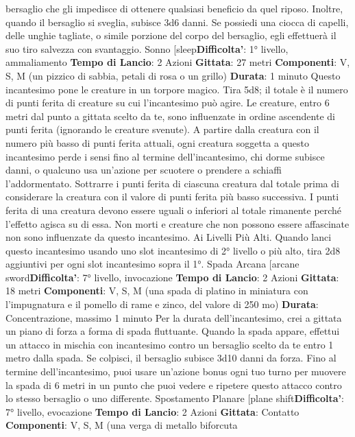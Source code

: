 \begin{multicols}{2}
bersaglio che gli impedisce di ottenere qualsiasi
beneficio da quel riposo. Inoltre, quando il bersaglio si
sveglia, subisce 3d6 danni.
Se possiedi una ciocca di capelli, delle unghie tagliate,
o simile porzione del corpo del bersaglio, egli effettuerà
il suo tiro salvezza con svantaggio.
Sonno
[sleep\textbf{Difficolta'}:
1° livello, ammaliamento
\textbf{Tempo di Lancio}: 2 Azioni
\textbf{Gittata}: 27 metri
\textbf{Componenti}: V, S, M (un pizzico di sabbia, petali di
rosa o un grillo)
\textbf{Durata}: 1 minuto
Questo incantesimo pone le creature in un torpore
magico. Tira 5d8; il totale è il numero di punti ferita di
creature su cui l’incantesimo può agire. Le creature,
entro 6 metri dal punto a gittata scelto da te, sono
influenzate in ordine ascendente di punti ferita
(ignorando le creature svenute).
A partire dalla creatura con il numero più basso di punti
ferita attuali, ogni creatura soggetta a questo
incantesimo perde i sensi fino al termine
dell’incantesimo, chi dorme subisce danni, o qualcuno
usa un’azione per scuotere o prendere a schiaffi
l’addormentato. Sottrarre i punti ferita di ciascuna
creatura dal totale prima di considerare la creatura con
il valore di punti ferita più basso successiva. I punti
ferita di una creatura devono essere uguali o inferiori al
totale rimanente perché l’effetto agisca su di essa.
Non morti e creature che non possono essere
affascinate non sono influenzate da questo
incantesimo.
Ai Livelli Più Alti. Quando lanci questo incantesimo
usando uno slot incantesimo di 2° livello o più alto, tira
2d8 aggiuntivi per ogni slot incantesimo sopra il 1°.
Spada Arcana
[arcane sword\textbf{Difficolta'}:
7° livello, invocazione
\textbf{Tempo di Lancio}: 2 Azioni
\textbf{Gittata}: 18 metri
\textbf{Componenti}: V, S, M (una spada di platino in miniatura
con l’impugnatura e il pomello di rame e zinco, del
valore di 250 mo)
\textbf{Durata}: Concentrazione, massimo 1 minuto
Per la durata dell’incantesimo, crei a gittata un piano di
forza a forma di spada fluttuante.
Quando la spada appare, effettui un attacco in mischia
con incantesimo contro un bersaglio scelto da te entro
1 metro dalla spada. Se colpisci, il bersaglio subisce
3d10 danni da forza. Fino al termine dell’incantesimo,
puoi usare un’azione bonus ogni tuo turno per muovere
la spada di 6 metri in un punto che puoi vedere e
ripetere questo attacco contro lo stesso bersaglio o uno
differente.
Spostamento Planare
[plane shift\textbf{Difficolta'}:
7° livello, evocazione
\textbf{Tempo di Lancio}: 2 Azioni
\textbf{Gittata}: Contatto
\textbf{Componenti}: V, S, M (una verga di metallo biforcuta

\end{multicols}
